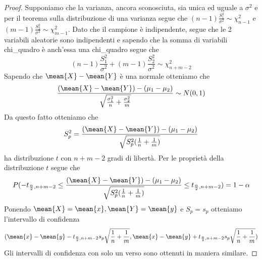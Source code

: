 \documentclass[a4paper,12pt, oneside]{book}
\begin{document}
\begin{proof}
    Supponiamo che la varianza, ancora sconosciuta, sia unica ed uguale a $\sigma^2$ e per il teorema sulla
    distribuzione di una varianza segue che $(n - 1)\frac{S_1^2}{\sigma^2} \sim \chi_{n - 1}^2$ e 
    $(m - 1) \frac{S_2^2}{\sigma^2} \sim \chi_{m - 1}^2$.\newline
    Dato che il campione è indipendente, segue che le 2 variabili aleatorie sono indipendenti e sapendo che la somma di
    variabili chi\_quadro è anch'essa una chi\_quadro segue che 
    \[ (n - 1)\frac{S_1^2}{\sigma^2} + (m - 1)\frac{S_2^2}{\sigma^2} \sim \chi_{n + m - 2}^2 \]
    Sapendo che $\mean{X} - \mean{Y}$ è una normale otteniamo che
    \[ \frac{(\mean{X} - \mean{Y}) - (\mu_1 - \mu_2)}{\sqrt{\frac{\sigma_1^2}{n} + \frac{\sigma_2^2}{m}}} \sim N(0, 1) \]
    Da questo fatto otteniamo che 
    \[ S_p^2 = \frac{(\mean{X} - \mean{Y}) - (\mu_1 - \mu_2)}{\sqrt{S_p^2(\frac{1}{n} + \frac{1}{m})}}\]
    ha distribuzione $t$ con $n + m - 2$ gradi di libertà.\newline
    Per le proprietà della distribuzione $t$ segue che
    \[ P(-t_{\frac{\alpha}{2}, n + m - 2} \leq 
             \frac{(\mean{X} - \mean{Y}) - (\mu_1 - \mu_2)}{\sqrt{S_p^2(\frac{1}{n} + \frac{1}{m})}}
                                          \leq t_{\frac{\alpha}{2}, n + m - 2}) = 1 - \alpha \]
    Ponendo $\mean{X} = \mean{x}, \mean{Y} = \mean{y}$ e $S_p = s_p$ otteniamo l'intervallo di confidenza
    \[ (\mean{x} - \mean{y} - t_{\frac{\alpha}{2}, n + m - 2} s_p \sqrt{\frac{1}{n} + \frac{1}{m}},
        \mean{x} - \mean{y} + t_{\frac{\alpha}{2}, n + m - 2} s_p \sqrt{\frac{1}{n} + \frac{1}{m}}) \]
    Gli intervalli di confidenza con solo un verso sono ottenuti in maniera similare.
\end{proof}

\end{document}
